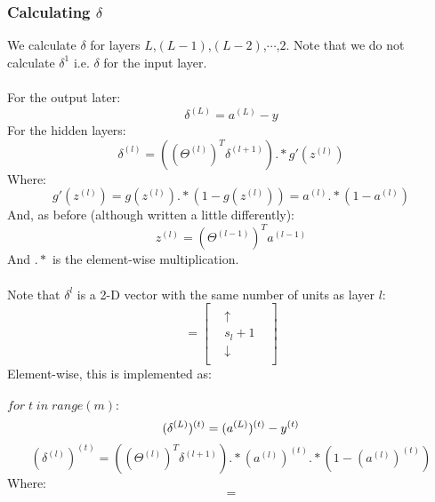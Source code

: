 \documentclass[12pt]{article}
\begin{document}
\subsubsection*{Calculating $\delta$}
We calculate $\delta$ for layers $L$,$(L-1)$,$(L-2)$,$\cdots$,$2$. Note that we do not calculate $\delta^{1}$ i.e. $\delta$ for the input layer.\\
\\
For the output later:
\begin{equation}
\delta^{(L)}=a^{(L)}-y
\end{equation}
For the hidden layers:
\begin{equation}
\delta^{(l)}=((\Theta^{(l)})^{T}\delta^{(l+1)}).*g'(z^{(l)})
\end{equation}
Where:
\begin{equation}
g'(z^{(l)})=g(z^{(l)}).*(1-g(z^{(l)}))=a^{(l)}.*(1-a^{(l)})
\end{equation}
And, as before (although written a little differently):
\begin{equation}
z^{(l)}=(\Theta^{(l-1)})^{T}a^{(l-1)}
\end{equation}
And $.*$ is the element-wise multiplication.\\
\\
Note that $\delta^{l}$ is a 2-D vector with the same number of units as layer $l$:
\begin{equation}
[\delta^{l}]=\begin{bmatrix}
& &\\
& \uparrow &\\
& s_l+1 &\\
& \downarrow &\\
& &
\end{bmatrix}
\end{equation}
Element-wise, this is implemented as:\\
\\
$for\;t\;in\;range(m):$
\begin{equation*}
(\delta^{(L)})^{(t)}=(a^{(L)})^{(t)}-y^{(t)}\\
\end{equation*}
\begin{equation}
(\delta^{(l)})^{(t)}=((\Theta^{(l)})^{T}\delta^{(l+1)}).*(a^{(l)})^{(t)}.*(1-(a^{(l)})^{(t)})
\end{equation}
Where:
\begin{equation}
[(\delta^{(l)})^{(t)}=((\Theta^{(l)})^{T}\delta^{(l+1)})]=
\end{equation}
\end{document}
